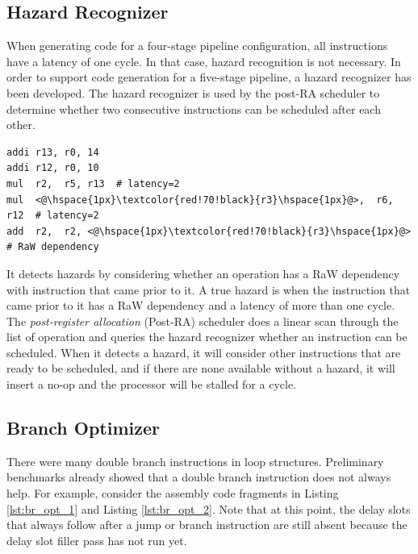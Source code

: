 \subsection{Hazard Recognizer}\label{sec:hazard_recogn}
When generating code for a four-stage pipeline configuration, all instructions have a latency of one cycle. In that case, hazard recognition is not necessary.
In order to support code generation for a five-stage pipeline, a hazard recognizer has been developed. The hazard recognizer is used by the post-RA scheduler to determine whether two consecutive instructions can be scheduled after each other. 

\lstset{style=customasm}
\begin{lstlisting}
addi r13, r0, 14
addi r12, r0, 10
mul  r2,  r5, r13  # latency=2
mul  <@\hspace{1px}\textcolor{red!70!black}{r3}\hspace{1px}@>,  r6, r12  # latency=2
add  r2,  r2, <@\hspace{1px}\textcolor{red!70!black}{r3}\hspace{1px}@>   # RaW dependency
\end{lstlisting}

It detects hazards by considering whether an operation has a RaW dependency with instruction that came prior to it. A true hazard is when the instruction that came prior to it has a RaW dependency and a latency of more than one cycle. The \emph{post-register allocation} (Post-RA) scheduler does a linear scan through the list of operation and queries the hazard recognizer whether an instruction can be scheduled. When it detects a hazard, it will consider other instructions that are ready to be scheduled, and if there are none available without a hazard, it will insert a no-op and the processor will be stalled for a cycle.


\subsection{Branch Optimizer}
There were many double branch instructions in loop structures. Preliminary benchmarks already showed that a double branch instruction does not always help. For example, consider the assembly code fragments in Listing \ref{lst:br_opt_1} and Listing \ref{lst:br_opt_2}. Note that at this point, the delay slots that always follow after a jump or branch instruction are still absent because the delay slot filler pass has not run yet.

